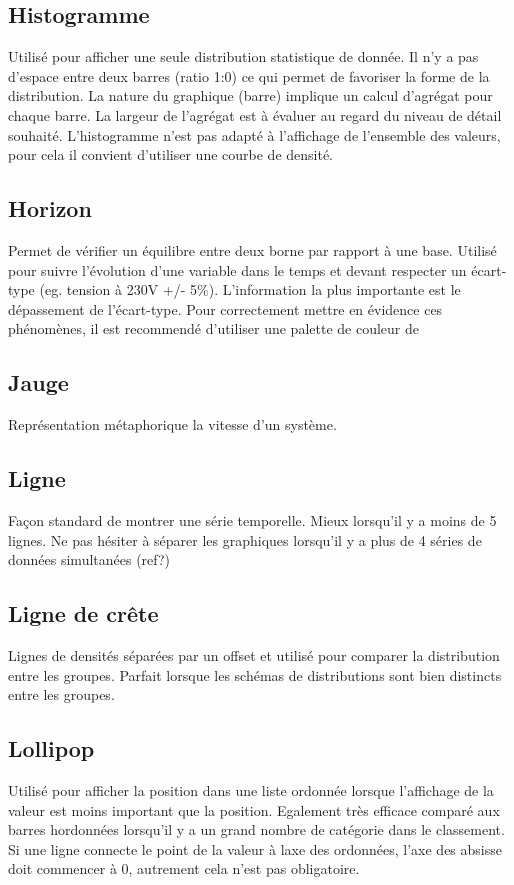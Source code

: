 \documentclass[a4paper,12pt]{article}
\begin{document}
\begin{multicols}{2}
\subsection*{Histogramme}
\label{sec:orgb82b164}
Utilisé pour afficher une seule distribution statistique de donnée. Il n'y a pas d'espace entre deux barres (ratio 1:0) ce qui permet de favoriser la forme de la distribution. \autocite{alansmithLexiqueVisuel} La nature du graphique (barre) implique un calcul d'agrégat pour chaque barre. La largeur de l'agrégat est à évaluer au regard du niveau de détail souhaité. L'histogramme n'est pas adapté à l'affichage de l'ensemble des valeurs, pour cela il convient d'utiliser une courbe de densité.
\subsection*{Horizon}
\label{sec:org9e33e16}
Permet de vérifier un équilibre entre deux borne par rapport à une base. \autocite{alansmithLexiqueVisuel}  Utilisé pour suivre l'évolution d'une variable dans le temps et devant respecter un écart-type (eg. tension à 230V +/- 5\%). L'information la plus importante est le dépassement de l'écart-type. Pour correctement mettre en évidence ces phénomènes, il est recommendé d'utiliser une palette de couleur de
\subsection*{Jauge}
\label{sec:orgc63af74}
Représentation métaphorique la vitesse d'un système.
\subsection*{Ligne}
\label{sec:org0396458}
Façon standard de montrer une série temporelle. \autocite{alansmithLexiqueVisuel}
Mieux lorsqu'il y a moins de 5 lignes. \autocite{mikeyiHowChooseRight2020}  Ne pas hésiter à séparer les graphiques lorsqu'il y a plus de 4 séries de données simultanées (ref?)
\subsection*{Ligne de crête}
\label{sec:org3d921f9}
Lignes de densités séparées par un offset et utilisé pour comparer la distribution entre les groupes. Parfait lorsque les schémas de distributions sont bien distincts entre les groupes. \autocite{mikeyiHowChooseRight2020}
\subsection*{Lollipop}
\label{sec:orgdd16c65}
Utilisé pour afficher la position dans une liste ordonnée lorsque l'affichage de la valeur est moins important que la position. \autocite{alansmithLexiqueVisuel} Egalement très efficace comparé aux barres hordonnées lorsqu'il y a un grand nombre de catégorie dans le classement. \autocite{mikeyiHowChooseRight2020}  Si une ligne connecte le point de la valeur à laxe des ordonnées, l'axe des absisse doit commencer à 0, autrement cela n'est pas obligatoire.

\end{multicols}
\end{document}
